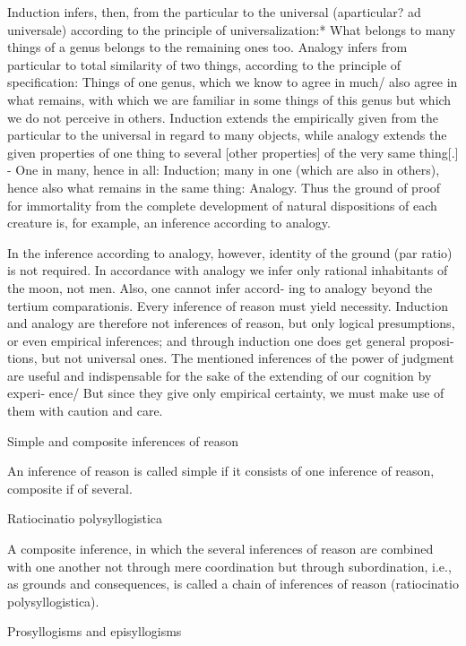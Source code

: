     Induction infers, then, from the particular to the universal (aparticular? ad
    universale) according to the principle of universalization:* What belongs to
    many things of a genus belongs to the remaining ones too. Analogy infers from
    particular to total similarity of two things, according to the principle of
    specification: Things of one genus, which we know to agree in much/ also
    agree in what remains, with which we are familiar in some things of this
    genus but which we do not perceive in others. Induction extends the
    empirically given from the particular to the universal in regard to many
    objects, while analogy extends the given properties of one thing to several
    [other properties] of the very same thing[.] - One in many, hence in all:
    Induction; many in one (which are also in others), hence also what remains
    in the same thing: Analogy. Thus the ground of proof for immortality
    from the complete development of natural dispositions of each creature
    is, for example, an inference according to analogy.

    In the inference according to analogy, however, identity of the ground
    (par ratio) is not required. In accordance with analogy we infer only
    rational inhabitants of the moon, not men. Also, one cannot infer accord-
    ing to analogy beyond the tertium comparationis.
    Every inference of reason must yield necessity. Induction and analogy are
    therefore not inferences of reason, but only logical presumptions, or even
    empirical inferences; and through induction one does get general proposi-
    tions, but not universal ones.
    The mentioned inferences of the power of judgment are useful and
    indispensable for the sake of the extending of our cognition by experi-
    ence/ But since they give only empirical certainty, we must make use of
    them with caution and care.

Simple and composite inferences of reason

An inference of reason is called simple if it consists
of one inference of reason, composite if of several.

Ratiocinatio polysyllogistica

A composite inference, in which the several inferences of reason are
combined with one another not through mere coordination but through
subordination, i.e., as grounds and consequences, is called
a chain of inferences of reason (ratiocinatio polysyllogistica).

Prosyllogisms and episyllogisms

